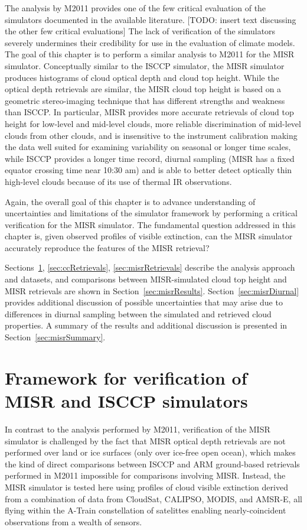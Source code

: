 The analysis by M2011 provides one of the few critical evaluation of the
simulators documented in the available literature. {[}TODO: insert text
discussing the other few critical evaluations{]} The lack of
verification of the simulators severely undermines their credibility for
use in the evaluation of climate models. The goal of this chapter is to
perform a similar analysis to M2011 for the MISR simulator. Conceptually
similar to the ISCCP simulator, the MISR simulator produces histograms
of cloud optical depth and cloud top height. While the optical depth
retrievals are similar, the MISR cloud top height is based on a
geometric stereo-imaging technique that has different strengths and
weakness than ISCCP. In particular, MISR provides more accurate
retrievals of cloud top height for low-level and mid-level clouds, more
reliable discrimination of mid-level clouds from other clouds, and is
insensitive to the instrument calibration making the data well suited
for examining variability on seasonal or longer time scales, while ISCCP
provides a longer time record, diurnal sampling (MISR has a fixed
equator crossing time near 10:30 am) and is able to better detect
optically thin high-level clouds because of its use of thermal IR
observations.

Again, the overall goal of this chapter is to advance understanding of
uncertainties and limitations of the simulator framework by performing a
critical verification for the MISR simulator. The fundamental question
addressed in this chapter is, given observed profiles of visible
extinction, can the MISR simulator accurately reproduce the features of
the MISR retrieval?

Sections~\ref{sec:framework}, \ref{sec:ccRetrievals}, \ref{sec:misrRetrievals}
describe the analysis approach and datasets, and comparisons between
MISR-simulated cloud top height and MISR retrievals are shown in
Section~\ref{sec:misrResults}. Section~\ref{sec:misrDiurnal} provides
additional discussion of possible uncertainties that may arise due to
differences in diurnal sampling between the simulated and retrieved
cloud properties. A summary of the results and additional discussion is
presented in Section~\ref{sec:misrSummary}.

\section{Framework for verification of MISR and ISCCP
simulators}\label{sec:framework}

In contrast to the analysis performed by M2011, verification of the MISR
simulator is challenged by the fact that MISR optical depth retrievals
are not performed over land or ice surfaces (only over ice-free open
ocean), which makes the kind of direct comparisons between ISCCP and ARM
ground-based retrievals performed in M2011 impossible for comparisons
involving MISR. Instead, the MISR simulator is tested here using
profiles of cloud visible extinction derived from a combination of data
from CloudSat, CALIPSO, MODIS, and AMSR-E, all flying within the A-Train
constellation of satelittes enabling nearly-coincident observations from
a wealth of sensors.

